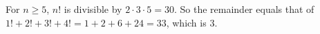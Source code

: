 For \(n\ge 5\), \(n!\) is divisible by \(2\cdot 3\cdot 5=30\). So the remainder equals that of \(1!+2!+3!+4!=1+2+6+24=33\), which is \(\boxed{3}\).
